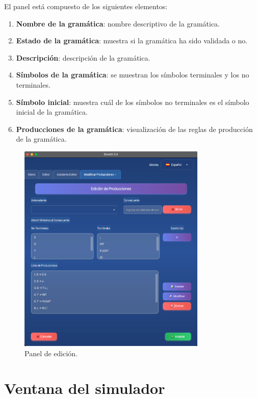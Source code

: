 El panel está compuesto de los siguientes elementos:
\begin{enumerate}
 \item \textbf{Nombre de la gramática}: nombre descriptivo de la gramática.
  \item \textbf{Estado de la gramática}: muestra si la gramática ha sido validada o no.
  \item \textbf{Descripción}: descripción de la gramática.
 \item \textbf{Símbolos de la gramática}: se muestran los símbolos terminales y los no terminales.
 \item \textbf{Símbolo inicial}: muestra cuál de los símbolos no terminales es el símbolo inicial de la gramática.
 \item \textbf{Producciones de la gramática}: visualización de las reglas de producción de la gramática.
 \end{enumerate}

\begin{figure}[htp]
\centering
	\includegraphics[width=0.8\textwidth]{figuras2/editor/panel_producciones.png}
	\caption{Panel de edición.}
	\label{fig:d4}
\end{figure}

\section{Ventana del simulador}

